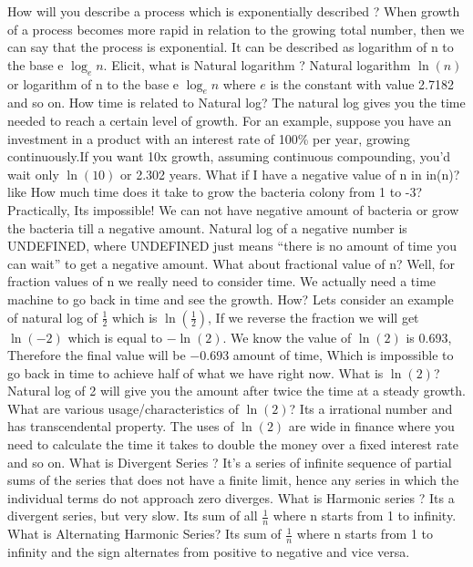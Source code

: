 \documentclass{article}
\begin{document}
\begin{description}
\me  How will you describe a process which is exponentially described ?
\prof  When growth of a process becomes more rapid in relation to the growing total number, then we can say that the process is exponential. It can be described as logarithm of n to the base e $\log_e{n}$.
\me Elicit, what is Natural logarithm ?
\prof Natural logarithm $\ln(n)$ or logarithm of n to the base e $\log_e{n}$ where $e$ is the constant with value 2.7182 and so on.
\me How time is related to Natural log?
\prof The natural log gives you the time needed to reach a certain level of growth. For an example, suppose you have an investment in a product with an interest rate of 100\% per year, growing continuously.If you want 10x growth, assuming continuous compounding, you’d wait only $\ln(10)$ or 2.302 years.
\me What if I have a negative value of n in in(n)? like How much time does it take to grow the bacteria colony from 1 to -3?
\prof Practically, Its impossible! We can not have negative amount of bacteria or grow the bacteria till a negative amount. Natural log of a negative number is UNDEFINED, where UNDEFINED just means “there is no amount of time you can wait” to get a negative amount.
\me What about fractional value of n?
\prof Well, for fraction values of n we really need to consider time. We actually need a time machine to go back in time and see the growth.
\me How?
\prof Lets consider an example of natural log of $\frac{1}{2}$ which is $\ln(\frac{1}{2})$, If we reverse the fraction we will get $\ln(-2)$ which is equal to $-\ln(2)$. We know the value of $\ln(2)$ is 0.693, Therefore the final value will be $-0.693$ amount of time, Which is impossible to go back in time to achieve half of what we have right now.
\me What is $\ln(2)$?
\prof Natural log of 2 will give you the amount after twice the time at a steady growth.
\me What are various usage/characteristics of $\ln(2)$?
\prof Its a irrational number and has transcendental property. The uses of $\ln(2)$ are wide in finance where you need to calculate the time it takes to double the money over a fixed interest rate and so on.
\me What is Divergent Series ?
\prof It's a series of infinite sequence of partial sums of the series that does not have a finite limit, hence any series in which the individual terms do not approach zero diverges.
\me What is Harmonic series ?
\prof Its a divergent series, but very slow. Its sum of all $\frac{1}{n}$ where n starts from 1 to infinity.
\me What is Alternating Harmonic Series?
\prof Its sum of $\frac{1}{n}$ where n starts from 1 to infinity and the sign alternates from positive to negative and vice versa.\\

\end{description}
\end{document}
